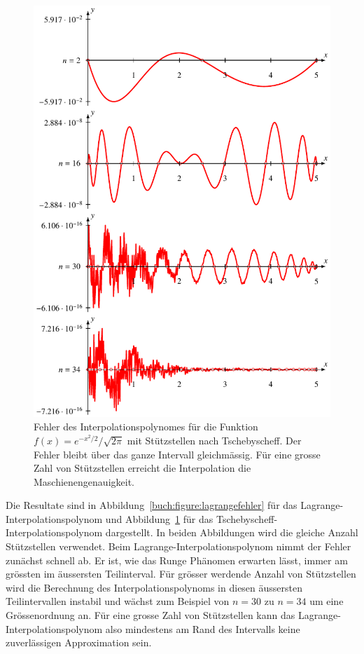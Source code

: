 \begin{figure}
\centering
\includegraphics{chapters/30-interpolation/figures/tscheb.pdf}
\caption{Fehler des Interpolationspolynomes für die Funktion
$f(x)=e^{-x^2/2}/\sqrt{2\pi}$ mit Stützstellen nach Tschebyscheff.
Der Fehler bleibt über das ganze Intervall gleichmässig.
Für eine grosse Zahl von Stützstellen erreicht die Interpolation die
Maschienengenauigkeit.
\label{buch:figure:tschebyschefffehler}}
\end{figure}

Die Resultate sind in Abbildung~\ref{buch:figure:lagrangefehler}
für das Lagrange-Interpolationspolynom und
Abbildung~\ref{buch:figure:tschebyschefffehler}
für das Tschebyscheff-Interpolationspolynom
dargestellt.
In beiden Abbildungen wird die gleiche Anzahl Stützstellen verwendet.
Beim Lagrange-Interpolationspolynom nimmt der Fehler zunächst schnell ab.
Er ist, wie das Runge Phänomen erwarten lässt, immer am grössten im
äussersten Teilinterval.
Für grösser werdende Anzahl von Stützstellen wird die Berechnung des 
Interpolationspolynoms in diesen äussersten Teilintervallen instabil
und wächst zum Beispiel von $n=30$ zu $n=34$ um eine Grössenordnung an.
Für eine grosse Zahl von Stützstellen kann das Lagrange-Interpolationspolynom
also mindestens am Rand des Intervalls keine zuverlässigen Approximation sein.

